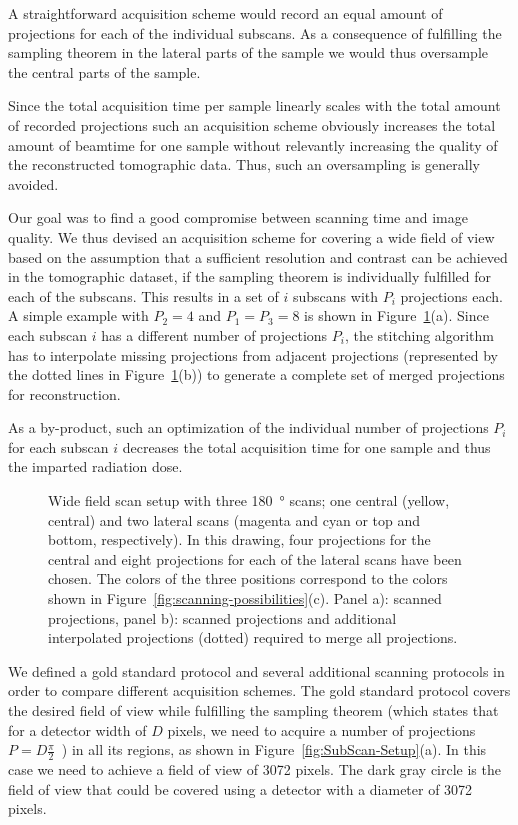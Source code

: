 A straightforward acquisition scheme would record an equal amount of projections for each of the individual subscans. As a consequence of fulfilling the sampling theorem in the lateral parts of the sample we would thus oversample the central parts of the sample. 

Since the total acquisition time per sample linearly scales with the total amount of recorded projections such an acquisition scheme obviously increases the total amount of beamtime for one sample without relevantly increasing the quality of the reconstructed tomographic data. Thus, such an oversampling is generally avoided.

Our goal was to find a good compromise between scanning time and image quality. We thus devised an acquisition scheme for covering a wide field of view based on the assumption that a sufficient resolution and contrast can be achieved in the tomographic dataset, if the sampling theorem is individually fulfilled for each of the subscans. This results in a set of $i$ subscans with $P_{i}$ projections each. A simple example with $P_{2}=4$ and $P_{1}=P_{3}=8$ is shown in Figure~\ref{fig:projections}(a). Since each subscan $i$ has a different number of projections $P_{i}$, the stitching algorithm has to interpolate missing projections from adjacent projections (represented by the dotted lines in Figure~\ref{fig:projections}(b)) to generate a complete set of merged projections for reconstruction.

As a by-product, such an optimization of the individual number of projections $P_{i}$ for each subscan $i$ decreases the total acquisition time for one sample and thus the imparted radiation dose.

\begin{figure}
	\centering
	\caption{Wide field scan setup with three \SI{180}{\degree} scans; one central (yellow, central) and two lateral scans (magenta and cyan or top and bottom, respectively). In this drawing, four projections for the central and eight projections for each of the lateral scans have been chosen. The colors of the three positions correspond to the colors shown in Figure~\ref{fig:scanning-possibilities}(c). Panel a): scanned projections, panel b): scanned projections and additional interpolated projections (dotted) required to merge all projections.}
	\ifiucr
		
	\else
	\fi
	\label{fig:projections}
\end{figure}	

We defined a gold standard protocol and several additional scanning protocols in order to compare different acquisition schemes. The gold standard protocol covers the desired field of view while fulfilling the sampling theorem (which states that for a detector width of $D$ pixels, we need to acquire a number of projections $P=D\frac{\pi}{2}$~\cite{Kak2002}) in all its regions, as shown in Figure~\ref{fig:SubScan-Setup}(a). In this case we need to achieve a field of view of 3072 pixels. The dark gray circle is the field of view that could be covered using a detector with a diameter of 3072 pixels.

